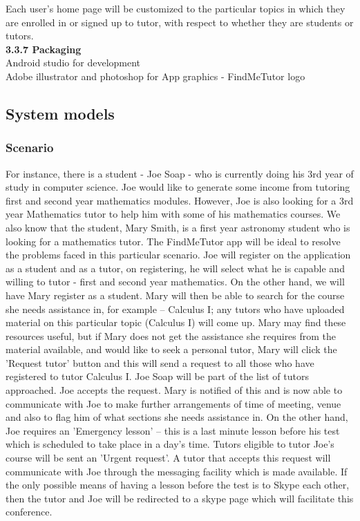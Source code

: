 \documentclass[12pt]{article}
\begin{document}
{Each user's home page will be customized to the particular topics in which they are enrolled in or signed up to tutor, with respect to whether they are students or tutors. \\
\textbf{3.3.7 Packaging}\\
Android studio for development\\
Adobe illustrator and photoshop for App graphics - FindMeTutor logo\\
}
\subsection{System models}

\subsubsection{Scenario}
\begin{flushleft}
For instance, there is a student - Joe Soap - who is currently doing his  3rd year of study in computer science.  Joe would like to generate some income from tutoring first and second year mathematics modules. However, Joe is also looking for a 3rd year Mathematics tutor to help him with some of his mathematics courses. We also know that the student, Mary Smith, is a first year astronomy student who is looking for a mathematics tutor. The FindMeTutor app will be ideal to resolve the problems faced in this particular scenario. Joe will register on the application as a student and as a tutor, on registering, he will select what he is capable and willing to tutor - first and second year mathematics. On the other hand, we will have Mary register as a student. Mary will then be able to search for the course she needs assistance in, for example – Calculus I; any tutors who have uploaded material on this particular topic (Calculus I) will come up. Mary may find these resources useful, but if Mary does not get the assistance she requires from the material available, and would like to seek a personal tutor, Mary will click the 'Request tutor' button and this will send a request to all those who have registered to tutor Calculus I. Joe Soap will be part of the list of tutors approached. Joe accepts the request. Mary is notified of this and is now able to communicate with Joe to make further arrangements of time of meeting, venue and also to flag him of what sections she needs assistance in. On the other hand, Joe requires an 'Emergency lesson' – this is a last minute lesson before his test which is scheduled to take place in a day's time. Tutors eligible to tutor Joe's course will be sent an 'Urgent request'. A tutor that accepts this request will communicate with Joe through the messaging facility which is made available. If the only possible means of having a lesson before the test is to Skype each other, then the tutor and Joe will be redirected to a skype page which will facilitate this conference.
\end{flushleft}
\end{document}
